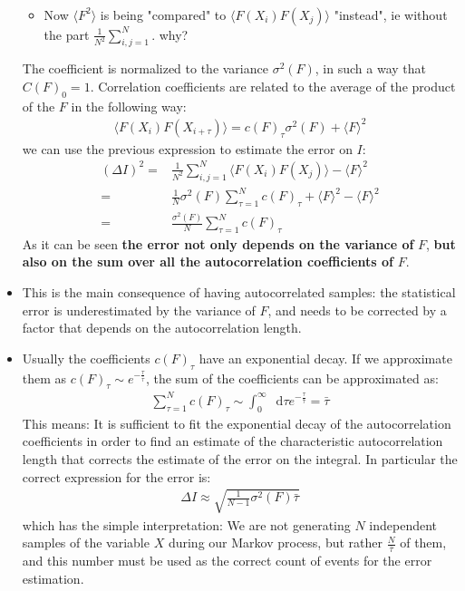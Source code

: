 \documentclass[twoside,english]{uiofysmaster}
\newcommand*\dif{\mathop{}\!\mathrm{d}}
\begin{document}
\begin{itemize}
\begin{align}
	\end{align}
	\begin{itemize}
		\item Now $ \langle F^2 \rangle$ is being "compared" to  $\langle F(X_i) F(X_j) \rangle $ "instead", ie without the part $\frac{1}{N^2} \sum_{i,j=1}^N $. why?	
	\end{itemize}
	The coefficient is normalized to the variance $\sigma^2 (F)$, in such a way that $C(F)_0 = 1$.
	Correlation coefficients are related to the average of the product of the $F$ in the following way:
	\begin{align}
		\langle F(X_i) F(X_{i+\tau}) \rangle = c(F)_\tau \sigma^2 (F) + \langle F \rangle^2
	\end{align}
	we can use the previous expression to estimate the error on $I$:
	\begin{align}
		(\Delta I)^2 =& \frac{1}{N^2} \sum_{i,j=1}^N \langle F(X_i) F(X_j) \rangle - \langle F \rangle^2 \\
		=& \frac{1}{N} \sigma^2 (F) \sum_{\tau=1}^N c(F)_\tau + \langle F \rangle^2 - \langle F \rangle^2 \\
		=& \frac{\sigma^2 (F)}{N} \sum_{\tau=1}^N c(F)_\tau
	\end{align}
	As it can be seen \textbf{the error not only depends on the variance of} $F$, \textbf{but also on the sum over all the autocorrelation coefficients of} $F$. 
	\item This is the main consequence of having autocorrelated samples: the statistical error is underestimated by the variance of $F$, and needs to be corrected by a factor that depends on the autocorrelation length. 
	\item Usually the coefficients $c(F)_\tau$ have an exponential decay. If we approximate them as $c(F)_\tau \sim e^{-\frac{\tau}{\bar{\tau}}}$, the sum of the coefficients can be approximated as:
	\begin{align}
		\sum_{\tau=1}^N c(F)_\tau \sim \int_0^\infty \dif \tau e^{-\frac{\tau}{\bar{\tau}}} = \bar{\tau}
	\end{align}
	This means: It is sufficient to fit the exponential decay of the autocorrelation coefficients in order to find an estimate of the characteristic autocorrelation length that corrects the estimate of the error on the integral. In particular the correct expression for the error is:
	\begin{align}
		\Delta I \approx \sqrt{ \frac{1}{N-1} \sigma^2 (F) \bar{\tau} }
	\end{align}
	which has the simple interpretation: We are not generating $N$ independent samples of the variable $X$ during our Markov process, but rather $\frac{N}{\bar{\tau}}$ of them, and this number must be used as the correct count of events for the error estimation. 

\end{itemize}
\end{document}
